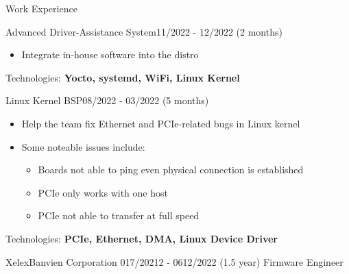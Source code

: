\documentclass{resume} %
\begin{document}
\begin{rSection}{Work Experience}
\begin{rCompanySubsection}
\begin{rProjectSubsubsection}{Advanced Driver-Assistance System}{11/2022 - 12/2022 (2 months)}
\begin{itemize}
\begin{itemize}
                    \item Integrate in-house software into the distro
                \end{itemize}
            \end{itemize}
            \hspace*{2.5em}Technologies: \textbf{Yocto, systemd, WiFi, Linux Kernel}
        \end{rProjectSubsubsection}
        \begin{rProjectSubsubsection}{Linux Kernel BSP}{08/2022 - 03/2022 (5 months)}
            \begin{itemize}
                \setlength{\itemindent}{1.25em}
                \item Help the team fix Ethernet and PCIe-related bugs in Linux kernel
                \item Some noteable issues include:
                \begin{itemize}
                    \item Boards not able to ping even physical connection is established
                    \item PCIe only works with one host
                    \item PCIe not able to transfer at full speed
                \end{itemize}
            \end{itemize}
            \hspace*{2.5em}Technologies: \textbf{PCIe, Ethernet, DMA, Linux Device Driver}
        \end{rProjectSubsubsection}
    \end{rCompanySubsection}
\begin{rCompanySubsection}
    {XelexBanvien Corporation}
    {017/20212 - 0612/2022 (1.5 year)}
    {Firmware Engineer}
    {}


\end{rCompanySubsection}
\end{rSection}
\end{document}
